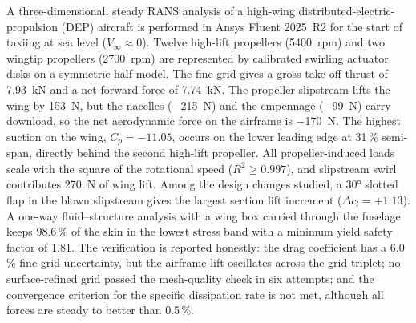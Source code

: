 \documentclass[10pt,a4paper]{article}
\begin{document}
\makepapertitle

\begin{abstractbox}
A three-dimensional, steady RANS analysis of a high-wing distributed-electric-propulsion (DEP) aircraft
is performed in Ansys Fluent 2025~R2 for the start of taxiing at sea level ($V_\infty\approx0$). Twelve high-lift
propellers (\SI{5400}{rpm}) and two wingtip propellers (\SI{2700}{rpm}) are represented by calibrated swirling
actuator disks on a symmetric half model. The fine grid gives a gross take-off thrust of \SI{7.93}{kN} and a net
forward force of \SI{7.74}{kN}. The propeller slipstream lifts the wing by \SI{+153}{N}, but the nacelles
(\SI{-215}{N}) and the empennage (\SI{-99}{N}) carry download, so the net aerodynamic force on the airframe is
\SI{-170}{N}. The highest suction on the wing, $C_p=-11.05$, occurs on the lower leading edge at 31\,\% semi-span,
directly behind the second high-lift propeller. All propeller-induced loads scale with the square of the rotational
speed ($R^2\geq0.997$), and slipstream swirl contributes \SI{270}{N} of wing lift. Among the design changes studied,
a \ang{30} slotted flap in the blown slipstream gives the largest section lift increment ($\Delta c_l=+1.13$).
A one-way fluid--structure analysis with a wing box carried through the fuselage keeps 98.6\,\% of the skin in the
lowest stress band with a minimum yield safety factor of 1.81. The verification is reported honestly: the drag
coefficient has a 6.0\,\% fine-grid uncertainty, but the airframe lift oscillates across the grid triplet; no
surface-refined grid passed the mesh-quality check in six attempts; and the convergence criterion for the specific
dissipation rate is not met, although all forces are steady to better than 0.5\,\%.
\end{abstractbox}
\end{document}

